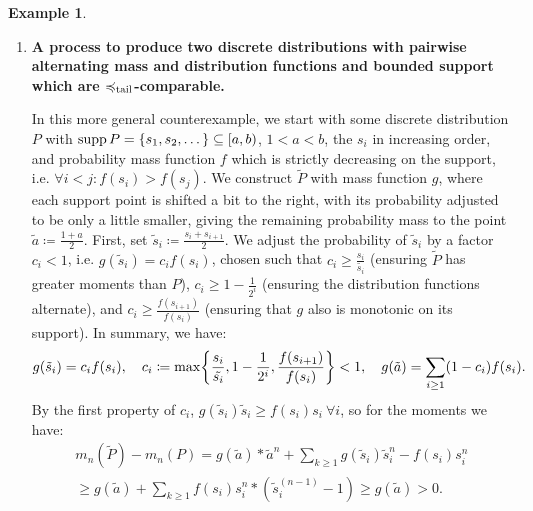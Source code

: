 \documentclass[a4paper]{scrreprt}
\theoremstyle{definition}
\newtheorem{ex}[thm]{Example} %
\begin{document}
\begin{ex}
\begin{enumerate}
\begin{figure}
                \label{fig:sufficientTailOrderConditionsCounterexamples}
                \caption{Plots for the counterexamples from Example \ref{ex:tailOrderSufficientConditionsCounterexamples}}
            \end{figure}
    
            \item 
            \textbf{A process to produce two discrete distributions with pairwise alternating mass and distribution functions and bounded support which are $\preccurlyeq_{\text{tail}}$-comparable.}
            
            \label{item:discreteSufficientTailOrderConditionCounterexample}
            In this more general counterexample, we start with some discrete distribution $P$ with $\operatorname{supp} P = \{s_1, s_2, \dots\} \subseteq [a, b)$, $1 < a < b$, the $s_i$ in increasing order, and probability mass function $f$ which is strictly decreasing on the support, i.e. $\forall i < j: f(s_i) > f(s_j)$. We construct $\tilde{P}$ with mass function $g$, where each support point is shifted a bit to the right, with its probability adjusted to be only a little smaller, giving the remaining probability mass to the point $\tilde{a} \coloneqq \frac{1+a}{2}$.
            First, set $\tilde{s}_i \coloneqq \frac{s_i+ s_{i+1}}{2}$.
            We adjust the probability of $\tilde{s}_i$ by a factor $c_i < 1$, i.e. $g(\tilde{s}_i) = c_i f(s_i)$, chosen such that $c_i \geq \frac{s_i}{\tilde{s_i}}$ (ensuring $\tilde{P}$ has greater moments than $P$), $c_i \geq 1-\frac{1}{2^i}$ (ensuring the distribution functions alternate), and $c_i \geq \frac{f(s_{i+1})}{f(s_i)}$ (ensuring that $g$ 
            also is monotonic on its support). In summary, we have:            
            \begin{gather*}
                g(\tilde{s}_i) = c_i f(s_i), \quad
                c_i \coloneqq \max\biggl\{\frac{s_i}{\tilde{s_i}}, 1-\frac{1}{2^i}, \frac{f(s_{i+1})}{f(s_i)}\biggr\} < 1, \quad
                g(\tilde{a}) = \sum_{i \geq 1} (1-c_i) f(s_i).
            \end{gather*}
            By the first property of $c_i$, $g(\tilde{s}_i)\tilde{s}_i \geq f(s_i)s_i ~\forall i$, so for the moments we have:
            \begin{multline*}
                m_n(\tilde{P}) - m_n(P)
                = g(\tilde{a})*\tilde{a}^n + \sum_{k \geq 1} g(\tilde{s}_i) \tilde{s}_i^n - f(s_i) s_i^n \\
                \geq g(\tilde{a}) + \sum_{k \geq 1} f(s_i) s_i^n * (\tilde{s}_i^{(n-1)} - 1)
                \geq g(\tilde{a}) > 0.
            \end{multline*}
            

\end{enumerate}
\end{ex}
\end{document}
